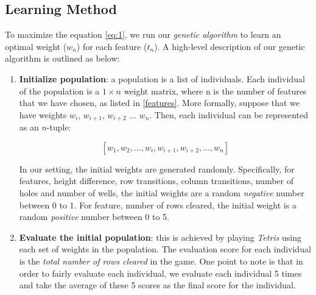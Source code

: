 \documentclass{article} %
\begin{document}
\begin{multicols}{2}
% 
% 
\subsection{Learning Method}\label{learning-method}
To maximize the equation \ref{eq:1}, we run our \textsl{genetic algorithm} to learn an optimal weight ($w_n$) for each feature ($t_n$). A high-level description of our genetic algorithm is outlined as below:

\begin{enumerate}
\item \textbf{Initialize population}: a population is a list of individuals. Each individual of the population is a $1 \times n$ weight matrix, where n is the number of features that we have chosen, as listed in \ref{features}. More formally, suppose that we have weights $w_i$, $w_{i+1}$, $w_{i+2}$ ... $w_n$. Then, each individual can be represented as an $n$-tuple:
% 
% 

$$
[ w_1, w_2, ..., w_i, w_{i+1}, w_{i+2}, ..., w_n ]
$$

In our setting, the initial weights are generated randomly. Specifically, for features, height difference, row transitions, column transitions, number of holes and number of wells, the initial weights are a random \textsl{negative} number between 0 to 1. For feature, number of rows cleared, the initial weight is a random \textsl{positive} number between 0 to 5.  

\item \textbf{Evaluate the initial population}: this is achieved by playing \textsl{Tetris} using each set of weights in the population. The evaluation score for each individual is the \textsl{total number of rows cleared} in the game. One point to note is that in order to fairly evaluate each individual, we evaluate each individual 5 times and take the average of these 5 scores as the final score for the individual.



\end{enumerate}
\end{multicols}
\end{document}
